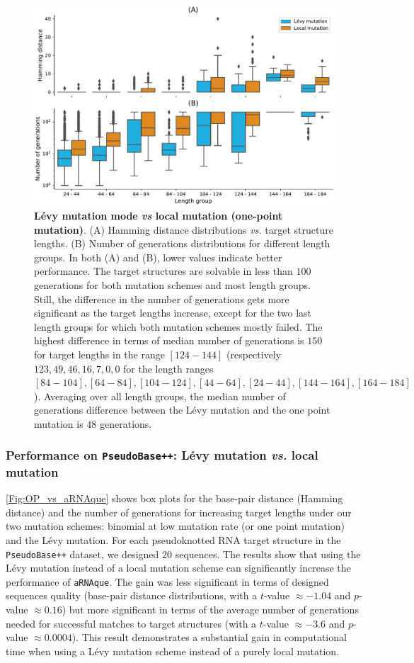 \begin{figure}[H]
	\includegraphics[width=1.0 \linewidth]{../res/images/arnaque/fig4.pdf}
	\small \caption{\textbf{Lévy mutation mode \emph{vs} local mutation (one-point mutation)}. (A) Hamming distance distributions \emph{vs.} target structure lengths. (B)  Number of generations distributions for different length groups. In both (A) and (B), lower values indicate better performance. The target structures are solvable in less than $100$ generations for both mutation schemes and most length groups. Still, the difference in the number of generations gets more significant as the target lengths increase, except for the two last length groups for which both mutation schemes mostly failed. The highest difference in terms of median number of generations is $150$ for target lengths in the range $[124-144]$ (respectively $123, 49, 46, 16, 7, 0, 0$ for the length ranges $[84-104], [64-84], [104-124], [44-64], [24-44], [144-164], [164-184]$). Averaging over all length groups, the median number of generations difference between the Lévy mutation and the one point mutation is $48$ generations. }\label{Fig:OP_vs_aRNAque}
\end{figure}
\subsubsection{Performance on \texttt{PseudoBase++}: Lévy mutation \emph{vs.} local mutation}
\autoref{Fig:OP_vs_aRNAque} shows box plots for the base-pair distance (Hamming distance) and the number of generations for increasing target lengths under our two mutation schemes: binomial at low mutation rate (or one point mutation) and the Lévy mutation. For each pseudoknotted \ac{RNA} target structure in the \texttt{PseudoBase++} dataset, we designed $20$ sequences.  The results show that using the Lévy mutation instead of a local mutation scheme can significantly increase the performance of \texttt{aRNAque}.  The gain was less significant in terms of designed sequences quality  (base-pair distance distributions, with a $t$-value $\approx -1.04$ and $p$-value $\approx 0.16$) but more significant in terms of the average number of generations needed for successful matches to target structures (with a $t$-value $\approx -3.6$ and $p$-value $\approx 0.0004$). This result demonstrates a substantial gain in computational time when using a Lévy mutation scheme instead of a purely local mutation.

